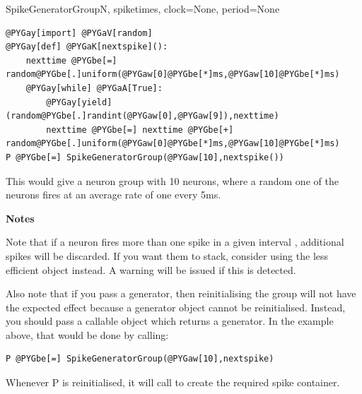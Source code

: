\documentclass[letterpaper,10pt,english]{manual}
\begin{document}
\begin{classdesc}{SpikeGeneratorGroup}{N, spiketimes, clock=None, period=None}
\begin{Verbatim}[commandchars=@\[\]]
@PYGay[import] @PYGaV[random]
@PYGay[def] @PYGaK[nextspike]():
    nexttime @PYGbe[=] random@PYGbe[.]uniform(@PYGaw[0]@PYGbe[*]ms,@PYGaw[10]@PYGbe[*]ms)
    @PYGay[while] @PYGaA[True]:
        @PYGay[yield] (random@PYGbe[.]randint(@PYGaw[0],@PYGaw[9]),nexttime)
        nexttime @PYGbe[=] nexttime @PYGbe[+] random@PYGbe[.]uniform(@PYGaw[0]@PYGbe[*]ms,@PYGaw[10]@PYGbe[*]ms)
P @PYGbe[=] SpikeGeneratorGroup(@PYGaw[10],nextspike())
\end{Verbatim}

This would give a neuron group  with 10 neurons, where a random one
of the neurons fires at an average rate of one every 5ms.

\textbf{Notes}

Note that if a neuron fires more than one spike in a given interval , additional
spikes will be discarded. If you want them to stack, consider using the less efficient
\hyperlink{brian.MultipleSpikeGeneratorGroup}{} object instead. A warning will be issued if this
is detected.

Also note that if you pass a generator, then reinitialising the group will not have the
expected effect because a generator object cannot be reinitialised. Instead, you should
pass a callable object which returns a generator. In the example above, that would be
done by calling:

\begin{Verbatim}[commandchars=@\[\]]
P @PYGbe[=] SpikeGeneratorGroup(@PYGaw[10],nextspike)
\end{Verbatim}

Whenever P is reinitialised, it will call  to create the required spike
container.
\end{classdesc}
\end{document}
